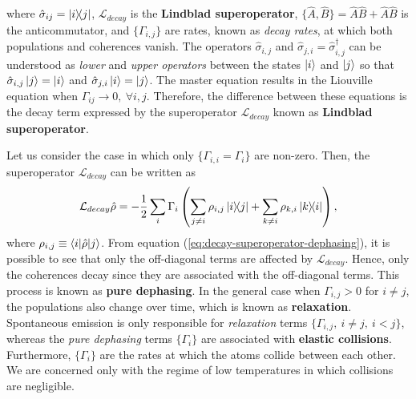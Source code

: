 where $ \hat{\sigma}_{ij} = \ketbra{i}{j} $, $ \mathcal{L}_{decay} $ is the \textbf{Lindblad superoperator}, $ \{\hat{A}, \hat{B}\} = \hat{A}\hat{B} + \hat{A}\hat{B}$ is the anticommutator, and $ \{\Gamma_{i,j}\} $ are rates, known as \textit{decay rates}, at which both populations and coherences vanish. The operators $ \hat{\sigma}_{i,j} $ and $ \hat{\sigma}_{j,i} = \hat{\sigma}_{i,j}^{\dagger} $ can be understood as \textit{lower} and \textit{upper operators} between the states $ \ket{i} $ and $ \ket{j} $ so that $ \hat{\sigma}_{i,j} \ket{j} = \ket{i} $ and $ \hat{\sigma}_{j,i} \ket{i} = \ket{j} $. The master equation results in the Liouville equation when $ \Gamma_{ij} \longrightarrow 0,\ \forall i,j $. Therefore, the difference between these equations is the decay term expressed by the superoperator $ \mathcal{L}_{decay} $ known as \textbf{Lindblad superoperator}.

Let us consider the case in which only $ \{\Gamma_{i,i} = \Gamma_i \} $ are non-zero. Then, the superoperator $ \mathcal{L}_{decay} $ can be written as
\begin{equation}
	\mathcal{L}_{decay} \hat{\rho} = - \frac{1}{2} \sum_{i} \Gamma_i \left( \sum_{j \neq i} \rho_{i,j} \ketbra{i}{j} + \sum_{k \neq i} \rho_{k,i} \ketbra{k}{i} \right),
	\label{eq:decay-superoperator-dephasing}
\end{equation}
where $ \rho_{i,j} \equiv \braket{i|\hat{\rho}|j} $. From equation (\ref{eq:decay-superoperator-dephasing}), it is possible to see that only the off-diagonal terms are affected by $ \mathcal{L}_{decay} $. Hence, only the coherences decay since they are associated with the off-diagonal terms. This process is known as \textbf{pure dephasing}. In the general case when $ \Gamma_{i,j} > 0 $ for $  i \neq j $, the populations also change over time, which is known as \textbf{relaxation}. Spontaneous emission is only responsible for \textit{relaxation} terms $ \{ \Gamma_{i,j},\ i \neq j,\ i  < j \} $, whereas the \textit{pure dephasing} terms $ \{ \Gamma_{i} \} $ are associated with \textbf{elastic collisions}. Furthermore, $\{ \Gamma_{i} \} $ are the rates at which the atoms collide between each other. We are concerned only with the regime of low temperatures in which collisions are negligible.

